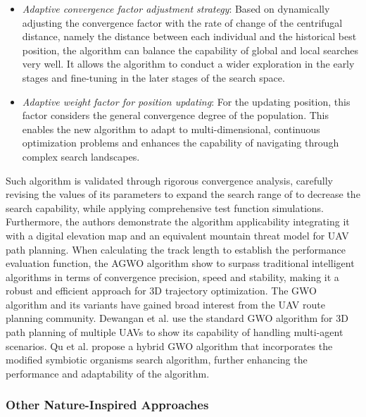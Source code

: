 \documentclass[conference]{IEEEtran}
\begin{document}
\begin{itemize}
    \item \textit{Adaptive convergence factor adjustment strategy}: Based on dynamically adjusting the convergence factor with the rate of change of the centrifugal distance, namely the distance between each individual and the historical best position, the algorithm can balance the capability of global and local searches very well. It allows the algorithm to conduct a wider exploration in the early stages and fine-tuning in the later stages of the search space.
    \item \textit{Adaptive weight factor for position updating}: For the updating position, this factor considers the general convergence degree of the population. This enables the new algorithm to adapt to multi-dimensional, continuous optimization problems and enhances the capability of navigating through complex search landscapes.
\end{itemize}

Such algorithm is validated through rigorous convergence analysis, carefully revising the values of its parameters to expand the search range of to decrease the search capability, while applying comprehensive test function simulations. Furthermore, the authors demonstrate the algorithm applicability integrating it with a digital elevation map and an equivalent mountain threat model for UAV path planning. When calculating the track length to establish the performance evaluation function, the AGWO algorithm show to surpass traditional intelligent algorithms in terms of convergence precision, speed and stability, making it a robust and efficient approach for 3D trajectory optimization. The GWO algorithm and its variants have gained broad interest from the UAV route planning community. Dewangan et al. \cite{gwo_3d} use the standard GWO algorithm for 3D path planning of multiple UAVs to show its capability of handling multi-agent scenarios. Qu et al. \cite{hybrid_gwo} propose a hybrid GWO algorithm that incorporates the modified symbiotic organisms search algorithm, further enhancing the performance and adaptability of the algorithm. \\

\subsubsection{Other Nature-Inspired Approaches}
\end{document}
